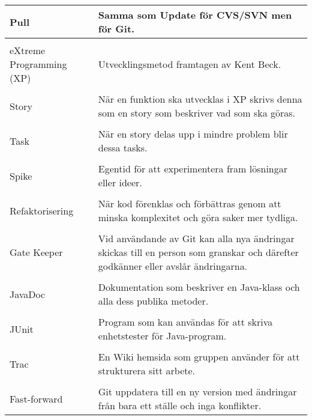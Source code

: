 \begin{table}
\begin{tabular}{ | l |  p{7cm} |}
\\Pull	 & Samma som Update för CVS/SVN men för Git. \\ \hline
\\eXtreme Programming (XP) &	Utvecklingsmetod framtagen av Kent Beck. \\ \hline
\\Story &	När en funktion ska utvecklas i XP skrivs denna som en story som beskriver vad som ska göras. \\ \hline
\\Task	& När en story delas upp i mindre problem blir dessa tasks. \\ \hline
\\Spike &	Egentid för att experimentera fram lösningar eller ideer. \\ \hline
\\Refaktorisering &	När kod förenklas och förbättras genom att minska komplexitet och göra saker mer tydliga. \\ \hline
\\Gate Keeper &	Vid användande av Git kan alla nya ändringar skickas till en person som granskar och därefter godkänner eller avslår ändringarna.  \\ \hline
\\JavaDoc &	Dokumentation som beskriver en Java-klass och alla dess publika metoder. \\ \hline
\\JUnit	& Program som kan användas för att skriva enhetstester för Java-program. \\ \hline
\\Trac	& En Wiki hemsida som gruppen använder för att strukturera sitt arbete. \\ \hline
\newpage
\\Fast-forward & Git uppdatera till en ny version med ändringar från bara ett ställe och inga konflikter. \\ \hline

\end{tabular}
\end{table}
